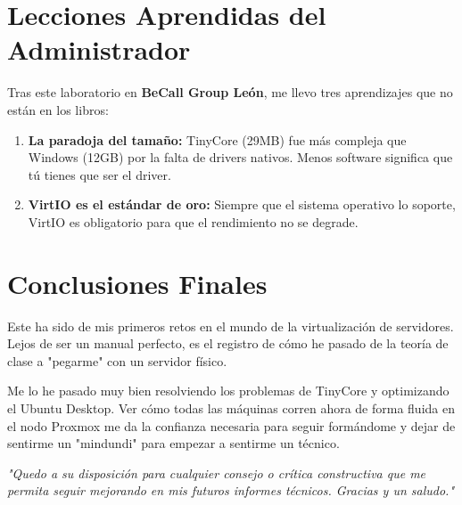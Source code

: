 \documentclass[11pt, a4paper]{article}
\begin{document}
\section{Lecciones Aprendidas del Administrador}
Tras este laboratorio en \textbf{BeCall Group León}, me llevo tres aprendizajes que no están en los libros:
\begin{enumerate}
    \item \textbf{La paradoja del tamaño:} TinyCore (29MB) fue más compleja que Windows (12GB) por la falta de drivers nativos. Menos software significa que tú tienes que ser el driver.
    \item \textbf{VirtIO es el estándar de oro:} Siempre que el sistema operativo lo soporte, VirtIO es obligatorio para que el rendimiento no se degrade.
\end{enumerate}

\section{Conclusiones Finales}
Este ha sido de mis primeros retos en el mundo de la virtualización de servidores. Lejos de ser un manual perfecto, es el registro de cómo he pasado de la teoría de clase a "pegarme" con un servidor físico. 

Me lo he pasado muy bien resolviendo los problemas de TinyCore y optimizando el Ubuntu Desktop. Ver cómo todas las máquinas corren ahora de forma fluida en el nodo Proxmox me da la confianza necesaria para seguir formándome y dejar de sentirme un "mindundi" para empezar a sentirme un técnico.

\vspace{2cm}
\begin{center}
    {\color{textgray} \textit{"Quedo a su disposición para cualquier consejo o crítica constructiva que me permita seguir mejorando en mis futuros informes técnicos. Gracias y un saludo."}}
\end{center}
\end{document}
